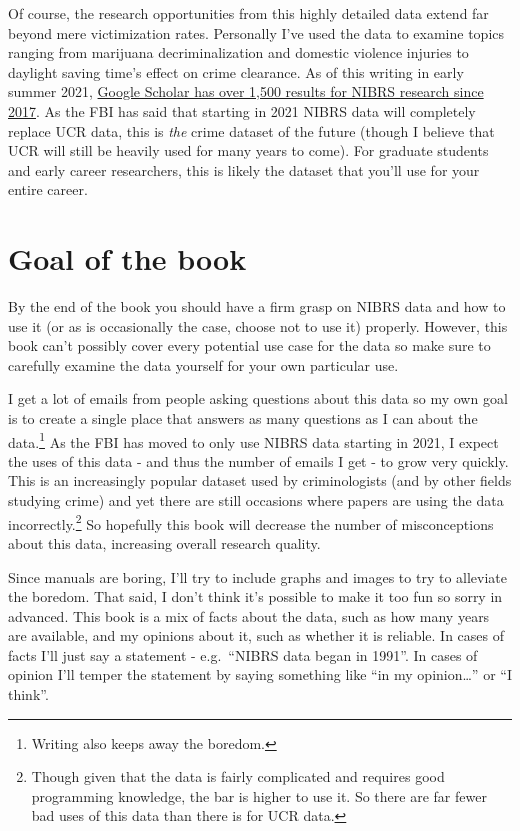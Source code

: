 \documentclass[
  12pt,
  openany]{book}
\begin{document}
Of course, the research opportunities from this highly detailed data extend far beyond mere victimization rates. Personally I've used the data to examine topics ranging from marijuana decriminalization and domestic violence injuries to daylight saving time's effect on crime clearance. As of this writing in early summer 2021, \href{https://scholar.google.com/scholar?as_ylo=2017\&q=NIBRS\&hl=en\&as_sdt=0,44}{Google Scholar has over 1,500 results for NIBRS research since 2017}. As the FBI has said that starting in 2021 NIBRS data will completely replace UCR data, this is \emph{the} crime dataset of the future (though I believe that UCR will still be heavily used for many years to come). For graduate students and early career researchers, this is likely the dataset that you'll use for your entire career.

\hypertarget{goal-of-the-book}{%
\section{Goal of the book}\label{goal-of-the-book}}

By the end of the book you should have a firm grasp on NIBRS data and how to use it (or as is occasionally the case, choose not to use it) properly. However, this book can't possibly cover every potential use case for the data so make sure to carefully examine the data yourself for your own particular use.

I get a lot of emails from people asking questions about this data so my own goal is to create a single place that answers as many questions as I can about the data.\footnote{Writing also keeps away the boredom.} As the FBI has moved to only use NIBRS data starting in 2021, I expect the uses of this data - and thus the number of emails I get - to grow very quickly. This is an increasingly popular dataset used by criminologists (and by other fields studying crime) and yet there are still occasions where papers are using the data incorrectly.\footnote{Though given that the data is fairly complicated and requires good programming knowledge, the bar is higher to use it. So there are far fewer bad uses of this data than there is for UCR data.} So hopefully this book will decrease the number of misconceptions about this data, increasing overall research quality.

Since manuals are boring, I'll try to include graphs and images to try to alleviate the boredom. That said, I don't think it's possible to make it too fun so sorry in advanced. This book is a mix of facts about the data, such as how many years are available, and my opinions about it, such as whether it is reliable. In cases of facts I'll just say a statement - e.g.~``NIBRS data began in 1991''. In cases of opinion I'll temper the statement by saying something like ``in my opinion\ldots{}'' or ``I think''.
\end{document}

